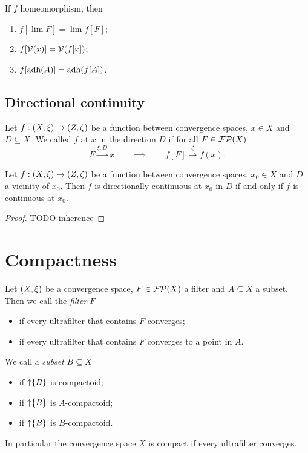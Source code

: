 \begin{proposition} \label{homeomorphismPreservation}
If $f$ homeomorphism, then
\begin{enumerate}
\item $f[\lim F] = \lim f[F]$;
\item $f[\operatorname{\mathcal{V}}(x)] = \operatorname{\mathcal{V}}(f[x])$;
\item $f[\operatorname{adh}(A)] = \operatorname{adh}(f[A])$.
\end{enumerate}
\end{proposition}


\subsection{Directional continuity}
\begin{definition}
Let $f: \sSet{X,\xi} \to \sSet{Z,\zeta}$ be a function between convergence spaces, $x\in X$ and $D\subseteq X$. We called $f$  at $x$ in the direction $D$ if for all $F\in\operatorname{\mathcal{FP}}(X)$
\[ F \overset{\xi,D}{\longrightarrow} x \qquad \implies \qquad f[F] \overset{\zeta}{\longrightarrow} f(x). \]
\end{definition}

\begin{lemma}
Let $f: \sSet{X,\xi} \to \sSet{Z,\zeta}$ be a function between convergence spaces, $x_0\in X$ and $D$ a vicinity of $x_0$. Then $f$ is directionally continuous at $x_0$ in $D$ \textup{if and only if} $f$ is continuous at $x_0$.
\end{lemma}
\begin{proof}
TODO inherence
\end{proof}

\section{Compactness}
\begin{definition}
Let $\sSet{X,\xi}$ be a convergence space, $F\in\operatorname{\mathcal{FP}}(X)$ a filter and $A\subseteq X$ a subset. Then we call the \emph{filter} $F$
\begin{itemize}
\item {} if every ultrafilter that contains $F$ converges;
\item {} if every ultrafilter that contains $F$ converges to a point in $A$.
\end{itemize}
We call a \emph{subset} $B\subseteq X$
\begin{itemize}
\item {} if $\operatorname{\uparrow}\{B\}$ is compactoid;
\item {} if $\operatorname{\uparrow}\{B\}$ is $A$-compactoid;
\item {} if $\operatorname{\uparrow}\{B\}$ is $B$-compactoid.
\end{itemize}
\end{definition}
In particular the convergence space $X$ is compact if every ultrafilter converges.

